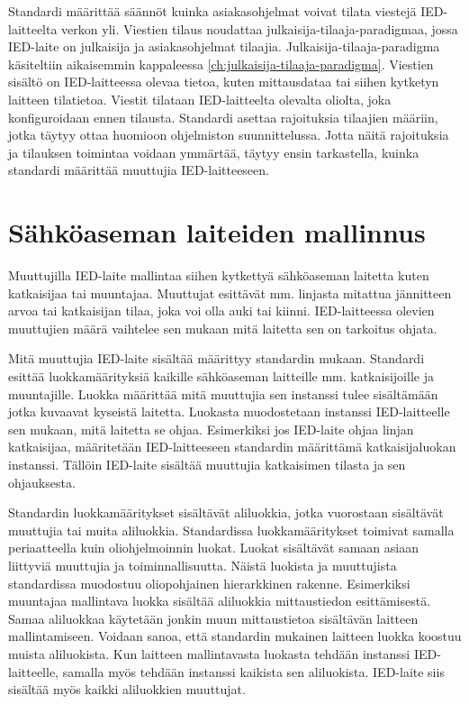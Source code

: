 Standardi määrittää säännöt kuinka asiakasohjelmat voivat tilata viestejä IED-laitteelta verkon yli. Viestien tilaus noudattaa julkaisija-tilaaja-paradigmaa, jossa IED-laite on julkaisija ja asiakasohjelmat tilaajia. Julkaisija-tilaaja-paradigma käsiteltiin aikaisemmin kappaleessa \ref{ch:julkaisija-tilaaja-paradigma}. Viestien sisältö on IED-laitteessa olevaa tietoa, kuten mittausdataa tai siihen kytketyn laitteen tilatietoa. Viestit tilataan IED-laitteelta olevalta oliolta, joka konfiguroidaan ennen tilausta. Standardi asettaa rajoituksia tilaajien määriin, jotka täytyy ottaa huomioon ohjelmiston suunnittelussa. Jotta näitä rajoituksia ja tilauksen toimintaa voidaan ymmärtää, täytyy ensin tarkastella, kuinka standardi määrittää muuttujia IED-laitteeseen. \mbox{\cite[s.~91--97]{IEC61850-7-2}}


\section{Sähköaseman laiteiden mallinnus}
Muuttujilla IED-laite mallintaa siihen kytkettyä sähköaseman laitetta kuten katkaisijaa tai muuntajaa. Muuttujat esittävät mm. linjasta mitattua jännitteen arvoa tai katkaisijan tilaa, joka voi olla auki tai kiinni. IED-laitteessa olevien muuttujien määrä vaihtelee sen mukaan mitä laitetta sen on tarkoitus ohjata. \cite[s.~28]{IEC61850-7-1}

Mitä muuttujia IED-laite sisältää määrittyy standardin mukaan. Standardi esittää luokkamäärityksiä kaikille sähköaseman laitteille mm. katkaisijoille ja muuntajille. Luokka määrittää mitä muuttujia sen instanssi tulee sisältämään jotka kuvaavat kyseistä laitetta. Luokasta muodostetaan instanssi IED-laitteelle sen mukaan, mitä laitetta se ohjaa. Esimerkiksi jos IED-laite ohjaa linjan katkaisijaa, määritetään IED-laitteeseen standardin määrittämä katkaisijaluokan instanssi. Tällöin IED-laite sisältää muuttujia katkaisimen tilasta ja sen ohjauksesta. \cite{IEC61850-7-3, IEC61850-7-4}

Standardin luokkamääritykset sisältävät aliluokkia, jotka vuorostaan sisältävät muuttujia tai muita aliluokkia. Standardissa luokkamääritykset toimivat samalla periaatteella kuin oliohjelmoinnin luokat. Luokat sisältävät samaan asiaan liittyviä muuttujia ja toiminnallisuutta. Näistä luokista ja muuttujista standardissa muodostuu oliopohjainen hierarkkinen rakenne. Esimerkiksi muuntajaa mallintava luokka sisältää aliluokkia mittaustiedon esittämisestä. Samaa aliluokkaa käytetään jonkin muun mittaustietoa sisältävän laitteen mallintamiseen. Voidaan sanoa, että standardin mukainen laitteen luokka koostuu muista aliluokista. Kun laitteen mallintavasta luokasta tehdään instanssi IED-laitteelle, samalla myös tehdään instanssi kaikista sen aliluokista. IED-laite siis sisältää myös kaikki aliluokkien muuttujat. \mbox{\cite[s.~108]{IEC61850-7-1}}


